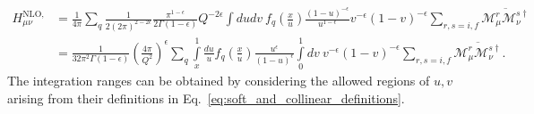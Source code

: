 \documentclass[withindex,glossary]{cam-thesis}
\begin{document}
\begin{align}
\label{eq:hadronic_nlo_real_phase_space}
H_{\mu\nu}^{\text{NLO, real}} &= \frac{1}{4\pi} \sum_{q}\frac{1}{2(2\pi)^{2 - 2\epsilon}} \frac{\pi^{1-\epsilon}}{2\Gamma(1-\epsilon)} Q^{-2\epsilon} \int  du dv\ f_q\left( \frac{x}{u} \right) \frac{(1-u)^{-\epsilon}}{u^{1-\epsilon}} v^{-\epsilon} (1-v)^{-\epsilon} \sum_{r,s=i,f} \overline{\mathcal{M}_{\mu}^r \mathcal{M}_{\nu}^{s\dagger}} \\[1.5ex]
&= \frac{1}{32 \pi ^2 \Gamma(1 - \epsilon)} \left( \frac{4\pi}{Q^2} \right)^{\epsilon} \sum_{q} \int\limits_{x}^{1} \frac{du}{u} f_q\left( \frac{x}{u} \right) \frac{u^{\epsilon}}{(1-u)^{\epsilon}} \int\limits_{0}^{1} dv\ v^{-\epsilon} (1-v)^{-\epsilon} \sum_{r,s=i,f} \overline{\mathcal{M}_{\mu}^r \mathcal{M}_{\nu}^{s\dagger}}.
\label{eq:hadronic_nlo_real_phase_space_2}
\end{align}
The integration ranges can be obtained by considering the allowed regions of $u,v$ arising from their definitions in Eq.~\eqref{eq:soft_and_collinear_definitions}.\\
\end{document}
